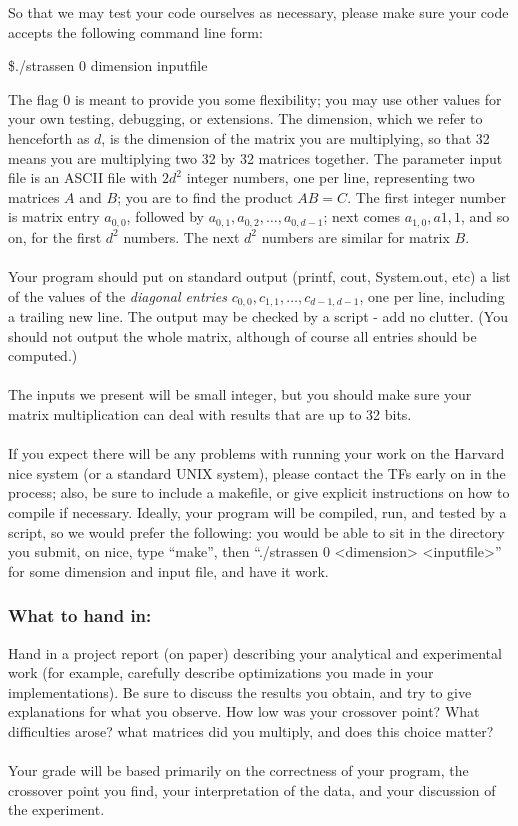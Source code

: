 \documentclass[tikz, 12pt]{scrartcl}
\begin{document}
So that we may test your code ourselves as necessary, please make sure your code accepts the following command line form:
\begin{center}
\$./strassen 0 dimension inputfile
\end{center}
The flag 0 is meant to provide you some flexibility; you may use other values for your own testing, debugging, or extensions. The dimension, which we refer to henceforth as $d$, is the dimension of the matrix you are multiplying, so that 32 means you are multiplying two 32 by 32 matrices together. The parameter input file is an ASCII file with $2d^2$ integer numbers, one per line, representing two matrices $A$ and $B$; you are to find the product $AB = C$. The first integer number is matrix entry $a_{0,0}$, followed by $a_{0,1}, a_{0,2}, \ldots, a_{0, d-1}$; next comes $a_{1,0}, a{1,1}$, and so on, for the first $d^{2}$ numbers. The next $d^2$ numbers are similar for matrix $B$. \\
\\
Your program should put on standard output (printf, cout, System.out, etc) a list of the values of the \textit{diagonal entries} $c_{0, 0}, c_{1,1}, \ldots, c_{d-1, d-1}$, one per line, including a trailing new line. The output may be checked by a script - add no clutter. (You should not output the whole matrix, although of course all entries should be computed.)\\
\\
The inputs we present will be small integer, but you should make sure your matrix multiplication can deal with results that are up to 32 bits.\\
\\
If you expect there will be any problems with running your work on the Harvard nice system (or a standard UNIX system), please contact the TFs early on in the process; also, be sure to include a makefile, or give explicit instructions on how to compile if necessary. Ideally, your program will be compiled, run, and tested by a script, so we would  prefer the following: you would be able to sit in the directory you submit, on nice, type ``make'', then ``./strassen 0 <dimension> <inputfile>'' for some dimension and input file, and have it work.

\subsubsection*{What to hand in:}
Hand in a project report (on paper) describing your analytical and experimental work (for example, carefully describe optimizations you made in your implementations). Be sure to discuss the results you obtain, and try to give explanations for what you observe. How low was your crossover point? What difficulties arose? what matrices did you multiply, and does this choice matter?\\
\\
Your grade will be based primarily on the correctness of your program, the crossover point you find, your interpretation of the data, and your discussion of the experiment.
\end{document}
